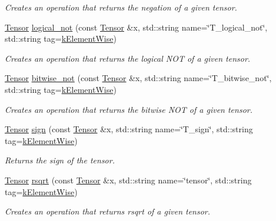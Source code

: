 \begin{DoxyCompactItemize}
\begin{DoxyCompactList}\small\item\em Creates an operation that returns the negation of a given tensor. \end{DoxyCompactList}\item 
\hyperlink{classtvm_1_1te_1_1Tensor}{Tensor} \hyperlink{namespacetopi_a0fb4fd70e46944f4dbcc0cc0790b0146}{logical\+\_\+not} (const \hyperlink{classtvm_1_1te_1_1Tensor}{Tensor} \&x, std\+::string name=\char`\"{}T\+\_\+logical\+\_\+not\char`\"{}, std\+::string tag=\hyperlink{namespacetopi_ac1b34ed59d38a5f5338bee6b2cad42be}{k\+Element\+Wise})
\begin{DoxyCompactList}\small\item\em Creates an operation that returns the logical N\+OT of a given tensor. \end{DoxyCompactList}\item 
\hyperlink{classtvm_1_1te_1_1Tensor}{Tensor} \hyperlink{namespacetopi_ab6cd26e240ccecfe8fec12e8107ddc2d}{bitwise\+\_\+not} (const \hyperlink{classtvm_1_1te_1_1Tensor}{Tensor} \&x, std\+::string name=\char`\"{}T\+\_\+bitwise\+\_\+not\char`\"{}, std\+::string tag=\hyperlink{namespacetopi_ac1b34ed59d38a5f5338bee6b2cad42be}{k\+Element\+Wise})
\begin{DoxyCompactList}\small\item\em Creates an operation that returns the bitwise N\+OT of a given tensor. \end{DoxyCompactList}\item 
\hyperlink{classtvm_1_1te_1_1Tensor}{Tensor} \hyperlink{namespacetopi_a673e10ba936f6eafc4a516c95f63da71}{sign} (const \hyperlink{classtvm_1_1te_1_1Tensor}{Tensor} \&x, std\+::string name=\char`\"{}T\+\_\+sign\char`\"{}, std\+::string tag=\hyperlink{namespacetopi_ac1b34ed59d38a5f5338bee6b2cad42be}{k\+Element\+Wise})
\begin{DoxyCompactList}\small\item\em Returns the sign of the tensor. \end{DoxyCompactList}\item 
\hyperlink{classtvm_1_1te_1_1Tensor}{Tensor} \hyperlink{namespacetopi_a795309406565ae282d42f54462c3ece3}{rsqrt} (const \hyperlink{classtvm_1_1te_1_1Tensor}{Tensor} \&x, std\+::string name=\char`\"{}tensor\char`\"{}, std\+::string tag=\hyperlink{namespacetopi_ac1b34ed59d38a5f5338bee6b2cad42be}{k\+Element\+Wise})
\begin{DoxyCompactList}\small\item\em Creates an operation that returns rsqrt of a given tensor. \end{DoxyCompactList}\item 

\end{DoxyCompactItemize}
